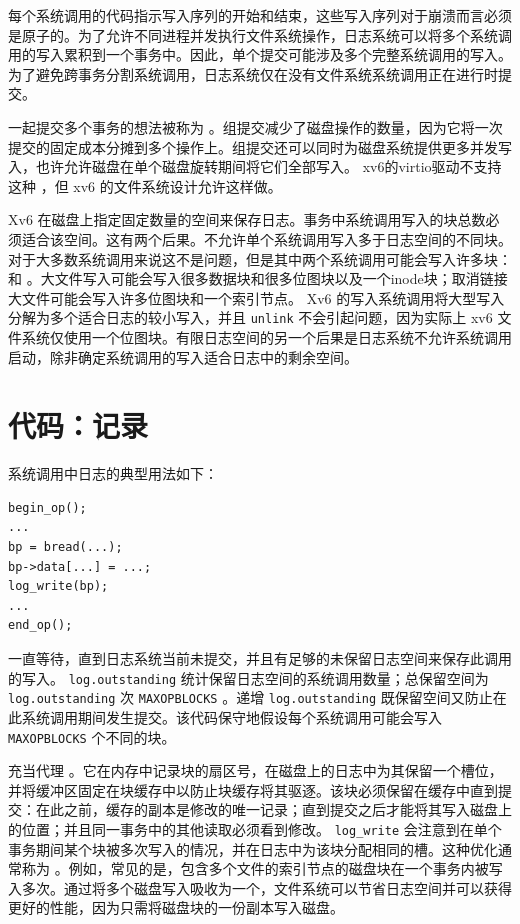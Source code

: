 每个系统调用的代码指示写入序列的开始和结束，这些写入序列对于崩溃而言必须是原子的。为了允许不同进程并发执行文件系统操作，日志系统可以将多个系统调用的写入累积到一个事务中。因此，单个提交可能涉及多个完整系统调用的写入。为了避免跨事务分割系统调用，日志系统仅在没有文件系统系统调用正在进行时提交。  

一起提交多个事务的想法被称为
        。组提交减少了磁盘操作的数量，因为它将一次提交的固定成本分摊到多个操作上。组提交还可以同时为磁盘系统提供更多并发写入，也许允许磁盘在单个磁盘旋转期间将它们全部写入。 xv6的virtio驱动不支持这种
        ，但 xv6 的文件系统设计允许这样做。  

Xv6 在磁盘上指定固定数量的空间来保存日志。事务中系统调用写入的块总数必须适合该空间。这有两个后果。不允许单个系统调用写入多于日志空间的不同块。对于大多数系统调用来说这不是问题，但是其中两个系统调用可能会写入许多块：
        和
        。大文件写入可能会写入很多数据块和很多位图块以及一个inode块；取消链接大文件可能会写入许多位图块和一个索引节点。 Xv6 的写入系统调用将大型写入分解为多个适合日志的较小写入，并且
    \lstinline{unlink}    不会引起问题，因为实际上 xv6 文件系统仅使用一个位图块。有限日志空间的另一个后果是日志系统不允许系统调用启动，除非确定系统调用的写入适合日志中的剩余空间。
    \section{代码：记录  }     

系统调用中日志的典型用法如下：
\begin{lstlisting}[]
begin_op();
...
bp = bread(...);
bp->data[...] = ...;
log_write(bp);
...
end_op();
\end{lstlisting}     

        一直等待，直到日志系统当前未提交，并且有足够的未保留日志空间来保存此调用的写入。
    \lstinline{log.outstanding}    统计保留日志空间的系统调用数量；总保留空间为
    \lstinline{log.outstanding}    次
    \lstinline{MAXOPBLOCKS}    。递增
    \lstinline{log.outstanding}    既保留空间又防止在此系统调用期间发生提交。该代码保守地假设每个系统调用可能会写入
    \lstinline{MAXOPBLOCKS}    个不同的块。  

        充当代理
        。它在内存中记录块的扇区号，在磁盘上的日志中为其保留一个槽位，并将缓冲区固定在块缓存中以防止块缓存将其驱逐。该块必须保留在缓存中直到提交：在此之前，缓存的副本是修改的唯一记录；直到提交之后才能将其写入磁盘上的位置；并且同一事务中的其他读取必须看到修改。
    \lstinline{log_write}    会注意到在单个事务期间某个块被多次写入的情况，并在日志中为该块分配相同的槽。这种优化通常称为
        。例如，常见的是，包含多个文件的索引节点的磁盘块在一个事务内被写入多次。通过将多个磁盘写入吸收为一个，文件系统可以节省日志空间并可以获得更好的性能，因为只需将磁盘块的一份副本写入磁盘。  

